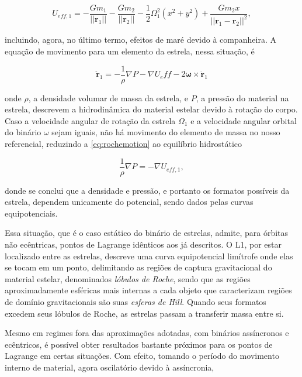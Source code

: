 \begin{equation}
    U_{eff, 1} = -\frac{Gm_1}{||\mathbf{r}_1||}-\frac{Gm_2}{||\mathbf{r}_2||}-\frac{1}{2}\Omega_1^2(x^2 + y^2)+\frac{Gm_2x}{||\mathbf{r}_1 - \mathbf{r}_2||^2},
\end{equation}

incluindo, agora, no último termo, efeitos de maré devido à companheira. A equação de movimento para um elemento da estrela, nessa situação, é

\begin{equation}
    \label{eq:rochemotion}
    \ddot{\mathbf{r}}_1 = -\frac{1}{\rho}\nabla P - \nabla U_eff - 2\mathbf{\omega}\times\dot{\mathbf{r}}_1
\end{equation}

onde $\rho$, a densidade volumar de massa da estrela, e $P$, a pressão do material na estrela, descrevem a hidrodinâmica do material estelar devido à rotação do corpo. Caso a velocidade angular de rotação da estrela $\Omega_1$ e a velocidade angular orbital do binário $\omega$ sejam iguais, não há movimento do elemento de massa no nosso referencial, reduzindo a \ref{eq:rochemotion} ao equilíbrio hidrostático

\begin{equation}
    \label{eq:staticroche}
    \frac{1}{\rho}\nabla P = -\nabla U_{eff, 1},
\end{equation}

donde se conclui que a densidade e pressão, e portanto os formatos possíveis da estrela, dependem unicamente do potencial, sendo dados pelas curvas equipotenciais.

Essa situação, que é o caso estático do binário de estrelas, admite, para órbitas não ecêntricas, pontos de Lagrange idênticos aos já descritos. O L1, por estar localizado entre as estrelas, descreve uma curva equipotencial limítrofe onde elas se tocam em um ponto, delimitando as regiões de captura gravitacional do material estelar, denominados \textit{lóbulos de Roche}, sendo que as regiões aproximadamente esféricas mais internas a cada objeto que caracterizam regiões de domínio gravitacionais são suas \textit{esferas de Hill}. Quando seus formatos excedem seus lóbulos de Roche, as estrelas passam a transferir massa entre si.

Mesmo em regimes fora das aproximações adotadas, com binários assíncronos e ecêntricos, é possível obter resultados bastante próximos para os pontos de Lagrange em certas situações. Com efeito, tomando o período do movimento interno de material, agora oscilatório devido à assíncronia,

